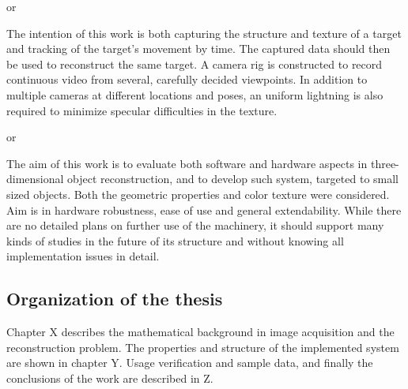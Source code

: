 or

The intention of this work is both capturing the structure and texture of a target and tracking of the target's movement by time.
The captured data should then be used to reconstruct the same target.
A camera rig is constructed to record continuous video from several, carefully decided viewpoints.
In addition to multiple cameras at different locations and poses, an uniform lightning is also required to minimize specular difficulties in the texture.

or

The aim of this work is to evaluate both software and hardware aspects in three-dimensional object reconstruction, and to develop such system, targeted to small sized objects.
Both the geometric properties and color texture were considered.
Aim is in hardware robustness, ease of use and general extendability. While there are no detailed plans on further use of the machinery, it should support many kinds of studies in the future of its structure and without knowing all implementation issues in detail.

\subsection{Organization of the thesis}

Chapter X describes the mathematical background in image acquisition and the reconstruction problem.
The properties and structure of the implemented system are shown in chapter Y.
Usage verification and sample data, and finally the conclusions of the work are described in Z.
